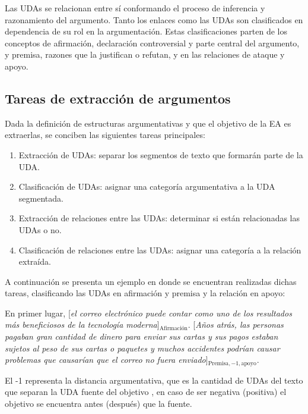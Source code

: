 \documentclass[a4paper,11pt,twocolumn,twoside]{article}
\begin{document}
Las UDAs se relacionan entre sí conformando el proceso de inferencia y razonamiento del argumento.
Tanto los enlaces como las UDAs son clasificados en dependencia de su rol en la argumentación. Estas clasificaciones 
parten de los conceptos de afirmación, declaración controversial y parte central del argumento, y premisa,
razones que la justifican o refutan, y en las relaciones de ataque y apoyo. 

\subsection{Tareas de extracción de argumentos}

Dada la definición de estructuras argumentativas y que el objetivo de la EA es extraerlas,
se conciben las siguientes tareas principales:

\begin{enumerate}
	\item Extracción de UDAs: separar los segmentos de texto que formarán parte de la UDA.
	\item Clasificación de UDAs: asignar una categoría argumentativa a la UDA segmentada.
	\item Extracción de relaciones entre las UDAs: determinar si están relacionadas las UDAs o no.
	\item Clasificación de relaciones entre las UDAs: asignar una categoría a la relación extraída.
\end{enumerate}

A continuación se presenta un ejemplo en donde se encuentran realizadas dichas tareas, clasificando
las UDAs en afirmación y premisa y la relación en apoyo:

\begin{adjustwidth}{25pt}{25pt}
	En primer lugar, [\textit{el correo electrónico puede contar como uno de los resultados
	más beneficiosos de la tecnología moderna}]$_{\mathrm{\text{Afirmación}}}$. [\textit{Años atrás, las personas pagaban gran cantidad de dinero para
	enviar sus cartas y sus pagos estaban sujetos al peso de sus cartas o paquetes y muchos accidentes podrían 
	causar problemas que causarían que el correo no fuera enviado}]$_{\mathrm{Premisa, -1, apoyo}}$.
\end{adjustwidth}

El -1 representa la distancia argumentativa, que es la cantidad de UDAs del texto que separan la 
UDA fuente del objetivo \cite{galassi2021deep}, en caso de ser negativa (positiva) el objetivo se encuentra 
antes (después) que la fuente.
\end{document}
